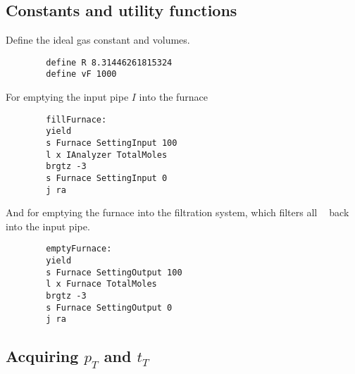 \documentclass{article}
\DeclareMathOperator{\CDiox}{\mathrm{CO}_2}
\begin{document}
\subsection{Constants and utility functions}

\begin{paracol}{2}
    Define the ideal gas constant and volumes.
    \switchcolumn
    \begin{verbatim}
        define R 8.31446261815324
        define vF 1000
    \end{verbatim}
    \switchcolumn*
    \noindent
    For emptying the input pipe $I$ into the furnace
    \switchcolumn
    \begin{verbatim}
        fillFurnace:
        yield
        s Furnace SettingInput 100
        l x IAnalyzer TotalMoles
        brgtz -3
        s Furnace SettingInput 0
        j ra
    \end{verbatim}
    \switchcolumn*
    \noindent
    And for emptying the furnace into the filtration system,
    which filters all $\CDiox$ back into the input pipe.
    \switchcolumn
    \vspace{-1em}
    \begin{verbatim}
        emptyFurnace:
        yield
        s Furnace SettingOutput 100
        l x Furnace TotalMoles
        brgtz -3
        s Furnace SettingOutput 0
        j ra
    \end{verbatim}
\end{paracol}

\subsection{Acquiring $p_T$ and $t_T$}
\end{document}
